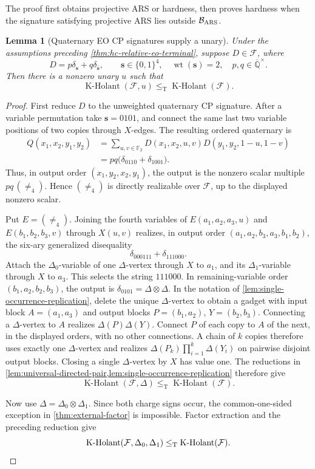 \documentclass[11pt,letterpaper,onecolumn]{article}
\theoremstyle{plain}
\newtheorem{lemma}[lemma]{Lemma}
\theoremstyle{definition}
\theoremstyle{remark}
\newcommand{\AlgNums}{\overline{\mathbb Q}}
\newcommand{\Ftwo}{\mathbb F_2}
\newcommand{\cF}{\mathcal F}
\newcommand{\KHolant}{\operatorname{K\text{-}Holant}}
\newcommand{\wt}{\operatorname{wt}}
\newcommand{\Neq}{\neq}
\newcommand{\DeltaZero}{\Delta_0}
\newcommand{\DeltaOne}{\Delta_1}
\newcommand{\leT}{\leq_{\mathrm T}}
\begin{document}
The proof first obtains projective ARS or hardness, then proves hardness when the signature satisfying projective ARS lies outside \(\mathcal B_{\rm ARS}\).

	\begin{lemma}[Quaternary EO CP signatures supply a unary]
		\label{lem:hc-rel-complementary-unary}
		Under the assumptions preceding \cref{thm:hc-relative-eo-terminal},
		suppose \(D\in\cF\), where
		\[
		D=p\delta_{\mathbf s}+q\delta_{\bar {\mathbf s}},
		\qquad
		{\mathbf s}\in\{0,1\}^4,\quad \wt({\mathbf s})=2,\quad p,q\in\AlgNums^\times.
		\]
		Then there is a nonzero unary \(u\) such that
		\[
		\KHolant(\cF,u)\leT\KHolant(\cF).
		\]
	\end{lemma}
	
	\begin{proof}
		First reduce \(D\) to the unweighted quaternary CP signature.  After a
		variable permutation take \({\mathbf s}=0101\), and connect the same last two variable
		positions of two copies through \(X\)-edges.  The resulting ordered
		quaternary is
		\[
		\begin{aligned}
			Q(x_1,x_2,y_1,y_2)
			&=\sum_{u,v\in\Ftwo}
			D(x_1,x_2,u,v)D(y_1,y_2,1-u,1-v)\\
			&=pq\bigl(\delta_{0110}+\delta_{1001}\bigr).
		\end{aligned}
		\]
		Thus, in output order \((x_1,y_2,x_2,y_1)\), the output is the nonzero
		scalar multiple \(pq\,(\Neq_4)\). Hence \((\Neq_4)\) is directly
		realizable over \(\cF\), up to the displayed nonzero scalar.
		
		Put \(E=(\Neq_4)\).  Joining the fourth variables of
		\(E(a_1,a_2,a_3,u)\) and \(E(b_1,b_2,b_3,v)\) through \(X(u,v)\)
		realizes, in output order \((a_1,a_2,b_3,a_3,b_1,b_2)\), the six-ary
		generalized disequality
		\[
		\delta_{000111}+\delta_{111000}.
		\]
		Attach the \(\DeltaZero\)-variable of one \(\Delta\)-vertex through
		\(X\) to \(a_1\), and its \(\DeltaOne\)-variable through \(X\) to \(a_3\).
		This selects the string \(111000\). In remaining-variable order
		\((b_1,a_2,b_2,b_3)\), the output is
		\(\delta_{0101}=\Delta\otimes\Delta\).  In the notation of
		\cref{lem:single-occurrence-replication}, delete the unique
		\(\Delta\)-vertex to obtain a gadget with input block \(A=(a_1,a_3)\)
		and output blocks \(P=(b_1,a_2)\), \(Y=(b_2,b_3)\).
		Connecting a \(\Delta\)-vertex to \(A\) realizes \(\Delta(P)\Delta(Y)\).
		Connect \(P\) of each copy to \(A\) of the next, in the displayed orders,
		with no other connections.  A chain of \(k\) copies therefore
		uses exactly one \(\Delta\)-vertex and realizes
		\(\Delta(P_k)\prod_{i=1}^k\Delta(Y_i)\) on pairwise disjoint output blocks.
		Closing a single \(\Delta\)-vertex by
		\(X\) has value one.  The reductions in
		\cref{lem:universal-directed-pair,lem:single-occurrence-replication}
		therefore give
		\[
		\KHolant(\cF,\Delta)\leT\KHolant(\cF).
		\]
		
		Now use \(\Delta=\DeltaZero\otimes\DeltaOne\).
		Since both charge signs occur, the common-one-sided exception in
		\cref{thm:external-factor} is impossible.  Factor extraction and the
		preceding reduction give
		\[
		\KHolant(\cF,\DeltaZero,\DeltaOne)\leT\KHolant(\cF).\qedhere
		\]
	\end{proof}
	
\end{document}
